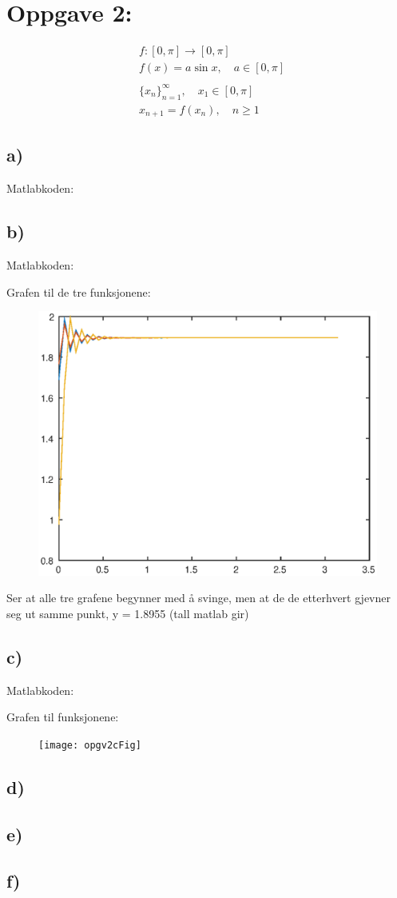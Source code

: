\documentclass[a4paper, norsk, twoside, 10pt]{article}
\begin{document}
\newpage

\section*{Oppgave 2:}
\[\begin{split}
&f  :  [0, \pi] \rightarrow [0, \pi]\\
&f(x) = a\sin{x}, \quad  a \in [0, \pi]\\
&\\
&\{x_{n}\}_{n=1}^{\infty}, \quad x_{1} \in [0, \pi]\\
&x_{n+1} = f(x_{n}), \quad n \geq 1
\end{split}\]


\subsection*{a)}
Matlabkoden:


\subsection*{b)}

Matlabkoden:

Grafen til de tre funksjonene:
\begin{figure}[H]
    \centering
    \includegraphics{opgv2bFig}
\end{figure} 

Ser at alle tre grafene begynner med å svinge, men at de de etterhvert gjevner seg ut samme punkt, y = 1.8955 (tall matlab gir)

\subsection*{c)}
Matlabkoden:

Grafen til funksjonene:
\begin{figure}[H]
    \centering
    \texttt{[image: opgv2cFig]}
\end{figure} 

\subsection*{d)}
\subsection*{e)}
\subsection*{f)}
\end{document}
